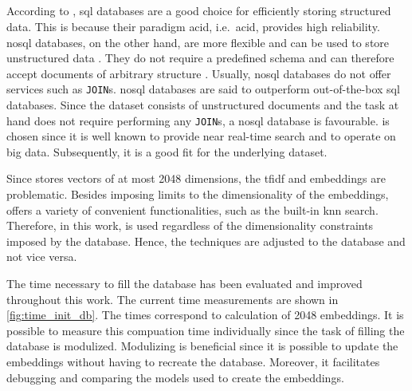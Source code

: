 \subsection*{\databaseName{}}\label{subsec:evaluation-db}
According to \citeauthor{flask_book2018}, \ac{sql} databases are a good choice for efficiently storing structured data.
This is because their paradigm \acs{acid}, i.e.\ \acl{acid}, provides high reliability.
\ac{nosql} databases, on the other hand, are more flexible and can be used to store unstructured data \cite{flask_book2018}.
They do not require a predefined schema and can therefore accept documents of arbitrary structure \cite{flask2018}.
Usually, \ac{nosql} databases do not offer services such as \texttt{JOIN}s.
\ac{nosql} databases are said to outperform out-of-the-box \ac{sql} databases.
Since the dataset consists of unstructured documents and the task at hand does not require performing any \texttt{JOIN}s, 
a \ac{nosql} database is favourable.
\databaseName{} is chosen since it is well known to provide near real-time search and to operate on big data.
Subsequently, it is a good fit for the underlying dataset.

Since \databaseName{} stores vectors of at most 2048 dimensions,
the \ac{tfidf} and \infersent{} embeddings are problematic.
Besides imposing limits to the dimensionality of the embeddings, \databaseName{} offers a variety of convenient functionalities,
such as the built-in \ac{knn} search.
Therefore, in this work, \databaseName{} is used regardless of the dimensionality constraints imposed by the database.
Hence, the techniques are adjusted to the database and not vice versa.

The time necessary to fill the \databaseName{} database has been evaluated and improved throughout this work.
The current time measurements are shown in \autoref{fig:time_init_db}.
The times correspond to calculation of 2048 embeddings.
It is possible to measure this compuation time individually since the task of filling the database is modulized. 
Modulizing is beneficial since it is possible to update the embeddings without having to recreate the database. 
Moreover, it facilitates debugging and comparing the models used to create the embeddings.

